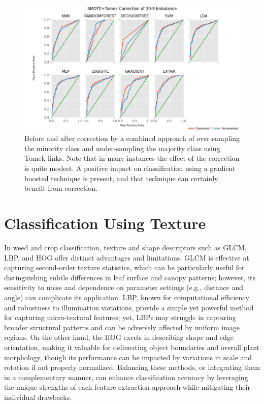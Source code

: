 \documentclass[letterpaper]{report}
\begin{document}
\begin{figure}[h]
	\centering
	\includegraphics[height=0.25\textheight]{figures/roc-corrected-tomek.png}
	\caption[Before and after correction]{Before and after correction by a combined approach of over-sampling the minority class and under-sampling the majority class using Tomek links. Note that in many instances the effect of the correction is quite modest. A positive impact on classification using a gradient boosted technique is present, and that technique can certainly benefit from correction. }
	\label{fig:auc-tomek}
\end{figure}

\section{Classification Using Texture}
In weed and crop classification, texture and shape descriptors such as \gls{GLCM}, \gls{LBP}, and \gls{HOG} offer distinct advantages and limitations. \gls{GLCM} is effective at capturing second-order texture statistics, which can be particularly useful for distinguishing subtle differences in leaf surface and canopy patterns; however, its sensitivity to noise and dependence on parameter settings (e.g., distance and angle) can complicate its application. LBP, known for computational efficiency and robustness to illumination variations, provide a simple yet powerful method for capturing micro-textural features; yet, LBPs may struggle in capturing broader structural patterns and can be adversely affected by uniform image regions. On the other hand, the \gls{HOG} excels in describing shape and edge orientation, making it valuable for delineating object boundaries and overall plant morphology, though its performance can be impacted by variations in scale and rotation if not properly normalized. Balancing these methods, or integrating them in a complementary manner, can enhance classification accuracy by leveraging the unique strengths of each feature extraction approach while mitigating their individual drawbacks.
%
%
\end{document}
